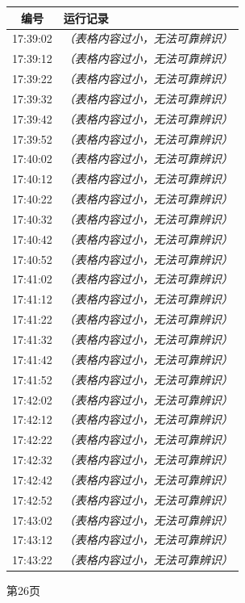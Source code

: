 \documentclass[UTF8,10pt,a4paper,fontset=fandol]{ctexart}
\begin{document}
\begin{center}
\begin{minipage}[t]{0.47\textwidth}
\vspace{2pt}
\begin{tabularx}{\linewidth}{|c|X|}
\hline
编号 & 运行记录 \\ \hline
17:39:02 & \textit{（表格内容过小，无法可靠辨识）} \\ \hline
17:39:12 & \textit{（表格内容过小，无法可靠辨识）} \\ \hline
17:39:22 & \textit{（表格内容过小，无法可靠辨识）} \\ \hline
17:39:32 & \textit{（表格内容过小，无法可靠辨识）} \\ \hline
17:39:42 & \textit{（表格内容过小，无法可靠辨识）} \\ \hline
17:39:52 & \textit{（表格内容过小，无法可靠辨识）} \\ \hline
17:40:02 & \textit{（表格内容过小，无法可靠辨识）} \\ \hline
17:40:12 & \textit{（表格内容过小，无法可靠辨识）} \\ \hline
17:40:22 & \textit{（表格内容过小，无法可靠辨识）} \\ \hline
17:40:32 & \textit{（表格内容过小，无法可靠辨识）} \\ \hline
17:40:42 & \textit{（表格内容过小，无法可靠辨识）} \\ \hline
17:40:52 & \textit{（表格内容过小，无法可靠辨识）} \\ \hline
17:41:02 & \textit{（表格内容过小，无法可靠辨识）} \\ \hline
17:41:12 & \textit{（表格内容过小，无法可靠辨识）} \\ \hline
17:41:22 & \textit{（表格内容过小，无法可靠辨识）} \\ \hline
17:41:32 & \textit{（表格内容过小，无法可靠辨识）} \\ \hline
17:41:42 & \textit{（表格内容过小，无法可靠辨识）} \\ \hline
17:41:52 & \textit{（表格内容过小，无法可靠辨识）} \\ \hline
17:42:02 & \textit{（表格内容过小，无法可靠辨识）} \\ \hline
17:42:12 & \textit{（表格内容过小，无法可靠辨识）} \\ \hline
17:42:22 & \textit{（表格内容过小，无法可靠辨识）} \\ \hline
17:42:32 & \textit{（表格内容过小，无法可靠辨识）} \\ \hline
17:42:42 & \textit{（表格内容过小，无法可靠辨识）} \\ \hline
17:42:52 & \textit{（表格内容过小，无法可靠辨识）} \\ \hline
17:43:02 & \textit{（表格内容过小，无法可靠辨识）} \\ \hline
17:43:12 & \textit{（表格内容过小，无法可靠辨识）} \\ \hline
17:43:22 & \textit{（表格内容过小，无法可靠辨识）} \\ \hline
\end{tabularx}

\vspace{3pt}
第26页
\end{minipage}
\end{center}
\end{document}
